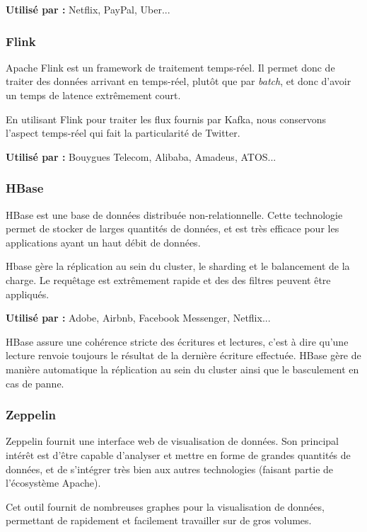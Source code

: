 \documentclass[a4paper,oneside,10pt]{article}
\begin{document}
\textbf{Utilisé par :} Netflix, PayPal, Uber...


\subsubsection{Flink}
Apache Flink est un framework de traitement temps-réel. Il permet donc de traiter des données arrivant en temps-réel, plutôt que par \textit{batch}, et donc d'avoir un temps de latence extr\^emement court.

En utilisant Flink pour traiter les flux fournis par Kafka, nous conservons l'aspect temps-réel qui fait la particularité de Twitter.

\textbf{Utilisé par :} Bouygues Telecom, Alibaba, Amadeus, ATOS...


\subsubsection{HBase}
HBase est une base de données distribuée non-relationnelle. Cette technologie permet de stocker de larges quantités de données, et est très efficace pour les applications ayant un haut débit de données.

Hbase gère la réplication au sein du cluster, le sharding et le balancement de la charge. Le requêtage est extrêmement rapide et des des filtres peuvent être appliqués.

\textbf{Utilisé par :} Adobe, Airbnb, Facebook Messenger, Netflix...

HBase assure une cohérence stricte des écritures et lectures, c'est à dire qu'une lecture renvoie toujours le résultat de la dernière écriture effectuée.
HBase gère de manière automatique la réplication au sein du cluster ainsi que le basculement en cas de panne.

\subsubsection{Zeppelin}
Zeppelin fournit une interface web de visualisation de données. Son principal intérêt est d'être capable d'analyser et mettre en forme de grandes quantités de données, et de s'intégrer très bien aux autres technologies (faisant partie de l'écosystème Apache).

Cet outil fournit de nombreuses graphes pour la visualisation de données, permettant de rapidement et facilement travailler sur de gros volumes.
\end{document}

